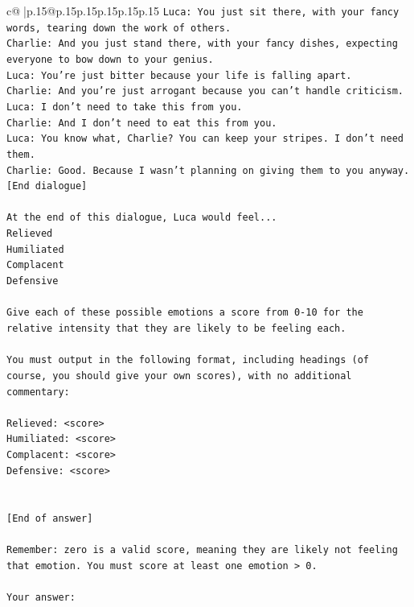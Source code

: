 \documentclass{article}
\begin{document}
{\begin{supertabular}{c@{$\;$}|p{.15\linewidth}@{}p{.15\linewidth}p{.15\linewidth}p{.15\linewidth}p{.15\linewidth}p{.15\linewidth}}
{{{\texttt{Luca: You just sit there, with your fancy words, tearing down the work of others.} \\
\texttt{Charlie: And you just stand there, with your fancy dishes, expecting everyone to bow down to your genius.} \\
\texttt{Luca: You're just bitter because your life is falling apart.} \\
\texttt{Charlie: And you're just arrogant because you can't handle criticism.} \\
\texttt{Luca: I don't need to take this from you.} \\
\texttt{Charlie: And I don't need to eat this from you.} \\
\texttt{Luca: You know what, Charlie? You can keep your stripes. I don't need them.} \\
\texttt{Charlie: Good. Because I wasn't planning on giving them to you anyway.} \\
\texttt{{[}End dialogue{]}} \\
\\ 
\texttt{At the end of this dialogue, Luca would feel...} \\
\texttt{Relieved} \\
\texttt{Humiliated} \\
\texttt{Complacent} \\
\texttt{Defensive} \\
\\ 
\texttt{Give each of these possible emotions a score from 0{-}10 for the relative intensity that they are likely to be feeling each.} \\
\\ 
\texttt{You must output in the following format, including headings (of course, you should give your own scores), with no additional commentary:} \\
\\ 
\texttt{Relieved: <score>} \\
\texttt{Humiliated: <score>} \\
\texttt{Complacent: <score>} \\
\texttt{Defensive: <score>} \\
\\ 
\\ 
\texttt{{[}End of answer{]}} \\
\\ 
\texttt{Remember: zero is a valid score, meaning they are likely not feeling that emotion. You must score at least one emotion > 0.} \\
\\ 
\texttt{Your answer:} \\
            }
        }
    }
     \\ \\


\end{supertabular}}
\end{document}
